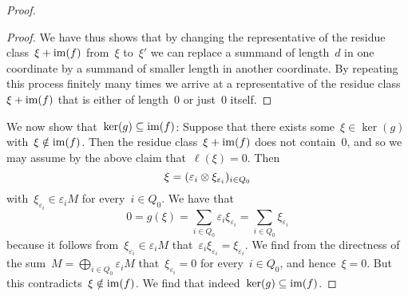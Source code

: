 \begin{proof}
\begin{proof}
    We have thus shows that by changing the representative of the residue class~$\xi + \operatorname{im}(f)$ from~$\xi$ to~$\xi'$ we can replace a summand of length~$d$ in one coordinate by a summand of smaller length in another coordinate.
    By repeating this process finitely many times we arrive at a representative of the residue class~$\xi + \operatorname{im}(f)$ that is either of length~$0$ or just~$0$ itself.
  \end{proof}
  
  We now show that~$\ker(g) \subseteq \operatorname{im}(f)$:
  Suppose that there exists some~$\xi \in \ker(g)$ with~$\xi \notin \operatorname{im}(f)$.
  Then the residue class~$\xi + \operatorname{im}(f)$ does not contain~$0$, and so we may assume by the above claim that~$\ell(\xi) = 0$.
  Then
  \[
    \xi
    =
    (
      \varepsilon_i \otimes \xi_{\varepsilon_i}
    )_{i \in Q_0}
  \]
  with~$\xi_{\varepsilon_i} \in \varepsilon_i M$ for every~$i \in Q_0$.
  We have that
  \[
    0
    =
    g(\xi)
    =
    \sum_{i \in Q_0}
    \varepsilon_i \xi_{\varepsilon_i}
    =
    \sum_{i \in Q_0}
    \xi_{\varepsilon_i}
  \]
  because it follows from~$\xi_{\varepsilon_i} \in \varepsilon_i M$ that~$\varepsilon_i \xi_{\varepsilon_i} = \xi_{\varepsilon_i}$.
  We find from the directness of the sum~$M = \bigoplus_{i \in Q_0} \varepsilon_i M$ that~$\xi_{\varepsilon_i} = 0$ for every~$i \in Q_0$, and hence~$\xi = 0$.
  But this contradicts~$\xi \notin \operatorname{im}(f)$.
  We find that indeed~$\ker(g) \subseteq \operatorname{im}(f)$.
  

\end{proof}
